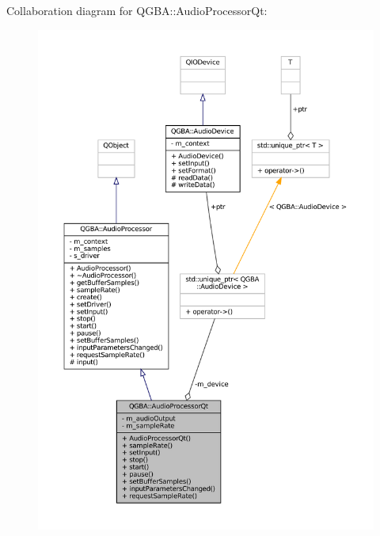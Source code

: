 Collaboration diagram for Q\+G\+BA\+:\+:Audio\+Processor\+Qt\+:
\nopagebreak
\begin{figure}[H]
\begin{center}
\leavevmode
\includegraphics[width=350pt]{class_q_g_b_a_1_1_audio_processor_qt__coll__graph}
\end{center}
\end{figure}
